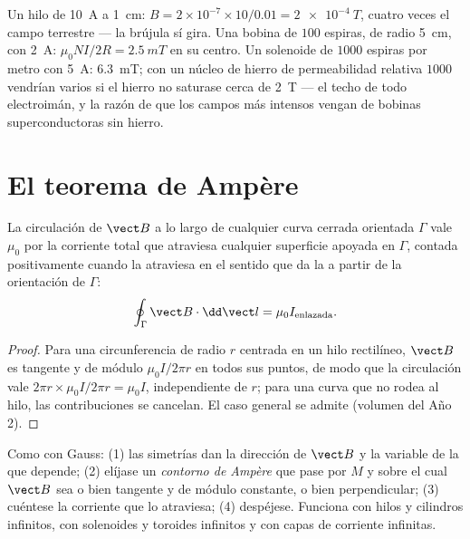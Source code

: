 \begin{example}\label{ex:b1:magnetostatics:orders}
Un hilo de \qty{10}{A} a \qty{1}{cm}: $B = 2 \times 10^{-7} \times 10/0.01 =
\qty{2e-4}{T}$, cuatro veces el campo terrestre --- la brújula sí gira.
Una bobina de $100$ espiras, de radio \qty{5}{cm}, con \qty{2}{A}: $\mu_0NI/2R =
\qty{2.5}{mT}$ en su centro. Un solenoide de $1000$ espiras por metro con
\qty{5}{A}: \qty{6.3}{mT}; con un núcleo de hierro de permeabilidad
relativa $1000$ vendrían varios  si el hierro no saturase cerca de
\qty{2}{T} --- el techo de todo electroimán, y la razón de que los campos
más intensos vengan de bobinas superconductoras sin hierro.
\end{example}

\section{El teorema de Ampère}

\begin{theorem}[Ampère]\label{thm:b1:magnetostatics:ampere}
La circulación de $\vect B$ a lo largo de cualquier curva cerrada
orientada $\Gamma$ vale $\mu_0$ por la corriente total que atraviesa
cualquier superficie apoyada en $\Gamma$, contada positivamente cuando la
atraviesa en el sentido que da la  a partir de la
orientación de $\Gamma$:
\[
\oint_\Gamma \vect B\cdot\dd\vect l = \mu_0 I_{\text{enlazada}} .
\]
\end{theorem}

\begin{proof}
Para una circunferencia de radio $r$ centrada en un hilo rectilíneo,
$\vect B$ es tangente y de módulo $\mu_0I/2\pi r$ en todos sus puntos, de
modo que la circulación vale $2\pi r \times \mu_0I/2\pi r = \mu_0I$,
independiente de $r$; para una curva que no rodea al hilo, las
contribuciones se cancelan. El caso general se admite (volumen del Año 2).
\end{proof}

\begin{method}\label{meth:b1:magnetostatics:ampere}
Como con Gauss: (1) las simetrías dan la dirección de $\vect B$ y la
variable de la que depende; (2) elíjase un \emph{contorno de Ampère} que
pase por $M$ y sobre el cual $\vect B$ sea o bien tangente y de módulo
constante, o bien perpendicular; (3) cuéntese la corriente que lo
atraviesa; (4) despéjese. Funciona con hilos y cilindros infinitos, con
solenoides y toroides infinitos y con capas de corriente infinitas.
\end{method}


